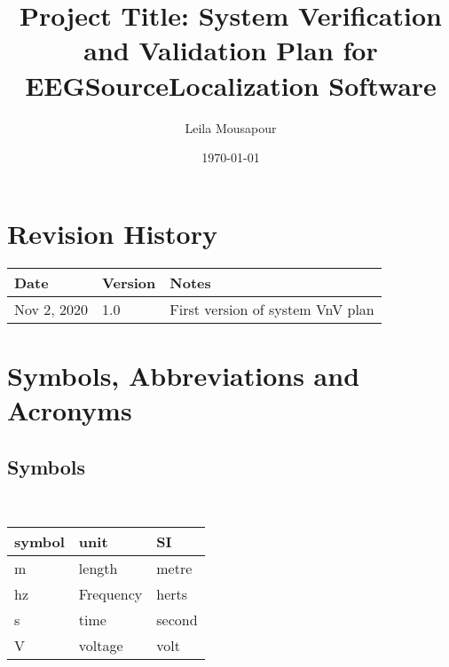\documentclass[12pt, titlepage]{article}
\renewcommand{\progname}{EEGSourceLocalization}
\begin{document}
\title{Project Title: System Verification and Validation Plan for \progname{} Software} 
\author{Leila Mousapour}
\date{\today}
	
\maketitle


\section{Revision History}

\begin{tabularx}{\textwidth}{p{3cm}p{2cm}X}
\toprule {\bf Date} & {\bf Version} & {\bf Notes}\\
\midrule
Nov 2, 2020 & 1.0 & First version of system VnV plan\\
\bottomrule
\end{tabularx}

\newpage

\tableofcontents

\listoftables

\listoffigures

\newpage

\section{Symbols, Abbreviations and Acronyms}



\subsection{Symbols}

~\newline

\renewcommand{\arraystretch}{1.2}
  \noindent \begin{tabular}{l l l} 
    \toprule		
    \textbf{symbol} & \textbf{unit} & \textbf{SI}\\
    \midrule 
    \si{\metre} & length & metre\\
    hz & Frequency	& herts\\
    \si{\second} & time & second\\
    \si{\volt} & voltage & volt\\
    \bottomrule
  \end{tabular}
  
\end{document}

